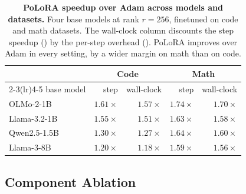 \documentclass[11pt]{article}
\newcommand{\methodname}{PoLoRA\xspace}
\theoremstyle{plain}
\theoremstyle{definition}
\theoremstyle{remark}
\theoremstyle{definition}
\begin{document}
\begin{table}[t]
\centering\small
\begin{tabular}{lrrrr}
\toprule
 & \multicolumn{2}{c}{Code} & \multicolumn{2}{c}{Math} \\
\cmidrule(lr){2-3}\cmidrule(lr){4-5}
base model & step & wall-clock & step & wall-clock \\
\midrule
OLMo-2-1B & $1.61\times$ & $1.57\times$ & $1.74\times$ & $1.70\times$ \\
Llama-3.2-1B & $1.55\times$ & $1.51\times$ & $1.63\times$ & $1.58\times$ \\
Qwen2.5-1.5B & $1.30\times$ & $1.27\times$ & $1.64\times$ & $1.60\times$ \\
Llama-3-8B & $1.20\times$ & $1.18\times$ & $1.59\times$ & $1.56\times$ \\
\bottomrule
\end{tabular}
\caption{\textbf{\methodname{} speedup over Adam across models and datasets.} Four base models at rank $r=256$, finetuned on code and math datasets. The wall-clock column discounts the step speedup () by the per-step overhead (). \methodname{} improves over Adam in every setting, by a wider margin on math than on code.}
\label{tab:breadth}
\end{table}

\subsection{Component Ablation}
\label{sec:exp-ablation}
\end{document}
